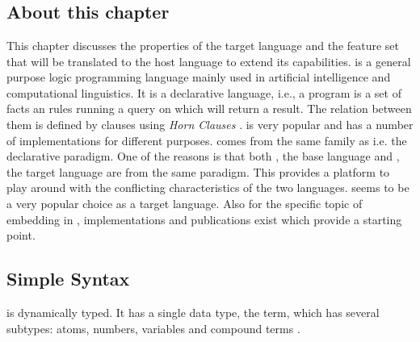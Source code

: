 \documentclass[thesis-solanki.tex]{subfiles}
\begin{document}
\chapter{}\label{chap:pwp}


\section{About this chapter}

This chapter discusses the properties of the target language  and the feature set that will be translated to the host 
language to extend its capabilities.
 is a general purpose logic programming language mainly used in artificial intelligence and
  computational linguistics.
  It is a declarative language, i.e., a program is a set of facts an rules running a
  query on which will return a result.
  The relation between them is defined by clauses using \textit{Horn Clauses} \cite{wikiprolog}.
   is very popular and has a number of implementations
  \cite{website:comparisonofprologimplementationswiki} for different purposes.  comes from the same family as 
   i.e. the declarative paradigm. One of the reasons is that both , the base language and , the target language are from the same paradigm.
  This provides a platform to play around with the conflicting characteristics of the two languages.
   seems to be a very popular choice as a target language. Also for the specific topic of embedding  in 
  , implementations and publications exist which provide a starting point.
  
\section{Simple Syntax}

 is dynamically typed. It has a single data type, the term, which has several subtypes: atoms, numbers, variables and 
compound terms \cite{wikiprolog}.
\end{document}
